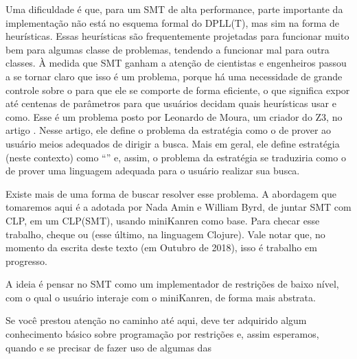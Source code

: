 \documentclass{article}
\begin{document}
Uma dificuldade é que, para um  SMT de alta
performance, parte importante da implementação não está no esquema
formal do DPLL(T), mas sim na forma de heurísticas. Essas heurísticas
são frequentemente projetadas para funcionar muito bem para algumas
classe de problemas, tendendo a funcionar mal para outra classes. À
medida que  SMT ganham a atenção de cientistas e
engenheiros passou a se tornar claro que isso é um problema, porque há
uma necessidade de grande controle sobre o  para que
ele se comporte de forma eficiente, o que 
significa expor até centenas de parâmetros para que usuários
decidam quais heurísticas usar e como. Esse é um problema posto por
Leonardo de Moura, um criador do Z3, no artigo \cite{moura}. Nesse
artigo, ele define o problema da estratégia como o de prover ao
usuário meios adequados de dirigir a busca. Mais em geral, ele define
estratégia (neste contexto) como ``''\cite{moura} e,
assim, o
problema da estratégia se traduziria como o de prover uma linguagem
adequada para o usuário realizar sua busca.

Existe mais de uma forma de buscar resolver esse problema. A abordagem
que tomaremos aqui é a adotada por Nada Amin e William Byrd, de juntar
SMT com CLP, em um CLP(SMT), usando miniKanren como base. Para checar
esse trabalho, cheque \cite{namin} ou \cite{namim} (esse último, na
linguagem Clojure). Vale notar que, no momento da escrita deste texto
(em Outubro de 2018), isso é trabalho em progresso.

A ideia é pensar no  SMT como um implementador de
restrições de baixo nível, com o qual o usuário interaje com o
miniKanren, de forma mais abstrata.






Se você prestou atenção no caminho até aqui, deve ter adquirido algum
conhecimento básico sobre programação por restrições e, assim
esperamos, quando e se precisar de fazer uso de algumas das 
\end{document}
